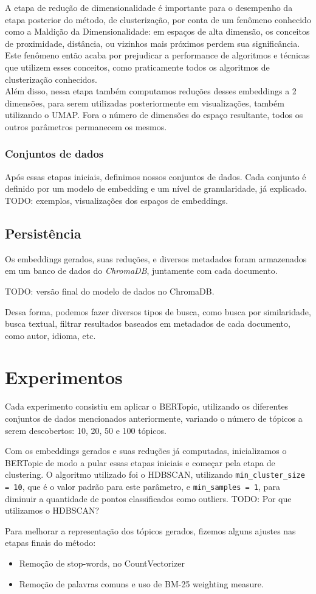 A etapa de redução de dimensionalidade é importante para o desempenho da etapa posterior do método, de clusterização, por conta de um fenômeno conhecido como a Maldição da Dimensionalidade: em espaços de alta dimensão, os conceitos de proximidade, distância, ou vizinhos mais próximos perdem sua significância. Este fenômeno então acaba por prejudicar a performance de algoritmos e técnicas que utilizem esses conceitos, como praticamente todos os algoritmos de clusterização conhecidos.\\
Além disso, nessa etapa também computamos reduções desses embeddings a 2 dimensões, para serem utilizadas posteriormente em visualizações, também utilizando o UMAP. Fora o número de dimensões do espaço resultante, todos os outros parâmetros permanecem os mesmos.

\subsubsection{Conjuntos de dados}
Após essas etapas iniciais, definimos nossos conjuntos de dados. Cada conjunto é definido por um modelo de embedding e um nível de granularidade, já explicado. TODO: exemplos, visualizações dos espaços de embeddings.

\subsection{Persistência}
Os embeddings gerados, suas reduções, e diversos metadados foram armazenados em um banco de dados do \textit{ChromaDB}, juntamente com cada documento.

TODO: versão final do modelo de dados no ChromaDB.

Dessa forma, podemos fazer diversos tipos de busca, como busca por similaridade, busca textual, filtrar resultados baseados em metadados de cada documento, como autor, idioma, etc.

\section{Experimentos}
Cada experimento consistiu em aplicar o BERTopic, utilizando os diferentes conjuntos de dados mencionados anteriormente, variando o número de tópicos a serem descobertos: 10, 20, 50 e 100 tópicos.

Com os embeddings gerados e suas reduções já computadas, inicializamos o BERTopic de modo a pular essas etapas iniciais e começar pela etapa de clustering. O algoritmo utilizado foi o HDBSCAN, utilizando \verb|min_cluster_size = 10|, que é o valor padrão para este parâmetro, e \verb|min_samples = 1|, para diminuir a quantidade de pontos classificados como outliers. TODO: Por que utilizamos o HDBSCAN?

Para melhorar a representação dos tópicos gerados, fizemos alguns ajustes nas etapas finais do método:
\begin{itemize}
    \item Remoção de stop-words, no CountVectorizer
    \item Remoção de palavras comuns e uso de BM-25 weighting measure.
\end{itemize}